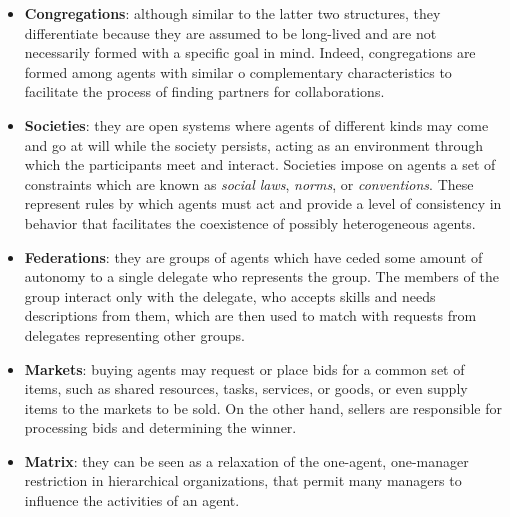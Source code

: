\begin{itemize}
    \item \textbf{Congregations}: although similar to the latter two structures, they differentiate because they are assumed to be long-lived and are not necessarily formed with a specific goal in mind.
    Indeed, congregations are formed among agents with similar o complementary characteristics to facilitate the process of finding partners for collaborations.
    \item \textbf{Societies}: they are open systems where agents of different kinds may come and go at will while the society persists, acting as an environment through which the participants meet and interact.
    Societies impose on agents a set of constraints which are known as \textit{social laws}, \textit{norms}, or \textit{conventions}.
    These represent rules by which agents must act and provide a level of consistency in behavior that facilitates the coexistence of possibly heterogeneous agents.
    \item \textbf{Federations}: they are groups of agents which have ceded some amount of autonomy to a single delegate who represents the group.
    The members of the group interact only with the delegate, who accepts skills and needs descriptions from them, which are then used to match with requests from delegates representing other groups.
    \item \textbf{Markets}: buying agents may request or place bids for a common set of items, such as shared resources, tasks, services, or goods, or even supply items to the markets to be sold.
    On the other hand, sellers are responsible for processing bids and determining the winner.
    \item \textbf{Matrix}: they can be seen as a relaxation of the one-agent, one-manager restriction in hierarchical organizations, that permit many managers to influence the activities of an agent.
\end{itemize}

